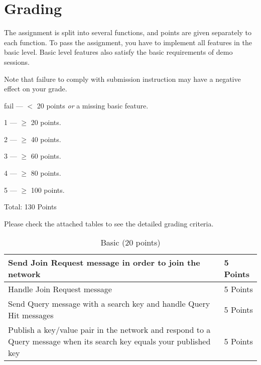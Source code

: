 \documentclass[12pt, a4paper]{article}
\begin{document}
\section{Grading}
The assignment is split into several functions, and points are given separately to each function.
To pass the assignment, you have to implement all features in the basic level.
Basic level features also satisfy the basic requirements of demo sessions.

Note that failure to comply with submission instruction may have a negative effect on your grade.

\vskip 20pt

fail --- $<$ 20 points \emph{or} a missing basic feature.

1 --- $\ge$ 20 points.

2 --- $\ge$  40 points.

3 --- $\ge$ 60 points.

4 --- $\ge$ 80 points.

5 --- $\ge$  100 points.

\vskip 20pt

Total: 130 Points

Please check the attached tables to see the detailed grading criteria.

\begin{table}[htdp]
\caption{Basic (20 points)}
\begin{center}
\begin{tabular}{|p{12cm}|p{2cm}|}
\hline
Send Join Request message in order to join the network & 5 Points \\
\hline
Handle Join Request message & 5 Points\\
\hline
Send Query message with a search key and handle Query Hit messages & 5 Points  \\
\hline
Publish a key/value pair in the network and respond to a Query message when its search key equals your published key & 5 Points \\
\hline
\end{tabular}
\end{center}
\end{table}
\end{document}

